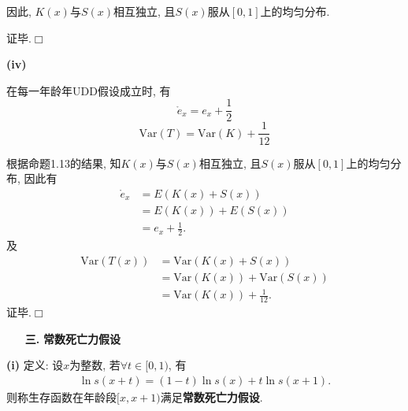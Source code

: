 \documentclass[a4paper,10pt]{ctexbook}
\newcommand{\hei}{\CJKfamily{hei}}      %
\def\qed{\hfill$\Box$\medskip}
\begin{document}
因此, $K(x)$与$S(x)$相互独立, 且$S(x)$服从$[0,1]$上的均匀分布.

证毕.\qed

{\rm\bf(iv)}  \begin{proposition}在每一年龄年UDD假设成立时, 有
    $$\mathring{e}_{x}=e_{x}+\frac{1}{2}$$
    $$\text{Var}(T)=\text{Var}(K)+\frac{1}{12}$$
\end{proposition}
\proof
根据命题1.13的结果, 知$K(x)$与$S(x)$相互独立, 且$S(x)$服从$[0,1]$上的均匀分布, 因此有
\begin{align*}
    \mathring{e}_{x} & =E(K(x)+S(x))        \\
                     & = E(K(x))+E(S(x))    \\
                     & = e_{x}+\frac{1}{2}.
\end{align*}
及\begin{align*}
    \text{Var}(T(x)) & =\text{Var}(K(x)+S(x))             \\
                     & =\text{Var}(K(x))+\text{Var}(S(x)) \\
                     & =\text{Var}(K(x))+\frac{1}{12}.
\end{align*}
证毕.\qed

\begin{itemize}
    \item[{\bf\hei 三.}]{\bf\hei 常数死亡力假设}
\end{itemize}

{\rm\bf(i)}  定义: 设$x$为整数, 若$\forall t\in [0,1)$, 有
\begin{align}\label{tul}
    \ln s(x+t)=(1-t)\ln s(x)+t\ln s(x+1).
\end{align}
则称生存函数在年龄段$[x,x+1)$满足\textbf{常数死亡力假设}.
\end{document}
